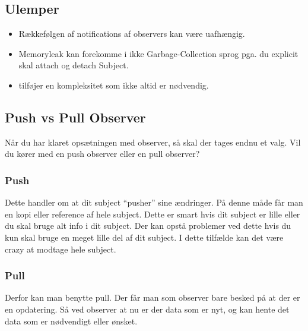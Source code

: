 \documentclass[../SWD_disp.tex]{subfiles}
\begin{document}
\subsection*{Ulemper}
\begin{itemize}
    \item Rækkefølgen af notifications af observers kan være uafhængig.
    \item Memoryleak kan forekomme i ikke Garbage-Collection sprog pga. du explicit skal attach og detach Subject.
    \item tilføjer en kompleksitet som ikke altid er nødvendig.
\end{itemize}
\subsection{Push vs Pull Observer}
Når du har klaret opsætningen med observer, så skal der tages endnu et valg. Vil du kører med en push observer eller en pull observer?
\subsubsection{Push}
Dette handler om at dit subject ``pusher'' sine ændringer. På denne måde får man en kopi eller reference af hele subject. Dette er smart hvis dit subject er lille eller du skal bruge alt info i dit subject. Der kan opstå problemer ved dette hvis du kun skal bruge en meget lille del af dit subject. I dette tilfælde kan det være crazy at modtage hele subject.    
\subsubsection{Pull}
Derfor kan man benytte pull. Der får man som observer bare besked på at der er en opdatering. Så ved observer at nu er der data som er nyt, og kan hente det data som er nødvendigt eller ønsket. 


\end{document}
